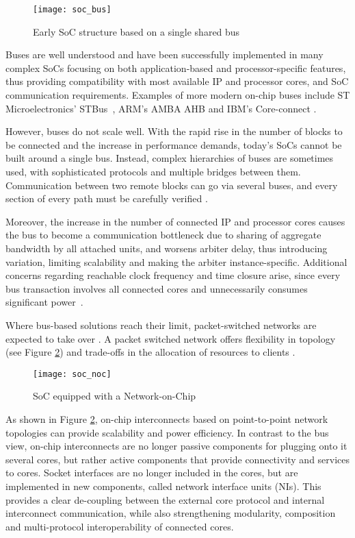 	\begin{figure}[ht]
	\centering
		\texttt{[image: soc\_bus]}
		\caption{Early SoC structure based on a single shared bus}
		\label{fig:soc_bus}
	\end{figure} 

Buses are well understood and have been successfully implemented in many complex SoCs focusing on both application-based and processor-specific features, thus providing compatibility with most available IP and processor cores, and SoC communication requirements. 
Examples of more modern on-chip buses include ST Microelectronics' STBus~\cite{scandurra2002stbus}, ARM's AMBA AHB and IBM's Core-connect \cite{ryu2001comparison}.

However, buses do not scale well. With the rapid rise in the number of blocks to be connected and the
increase in performance demands, today's SoCs cannot be built around a single bus. Instead, complex hierarchies of buses are sometimes used, with sophisticated protocols and multiple bridges between them.
Communication between two remote blocks can go via several buses, and every section of every path must be carefully verified \cite{furber2005future}. 

Moreover, the increase in the number of connected IP and processor cores causes the bus to become a communication bottleneck due to sharing of aggregate bandwidth by all attached units, and worsens arbiter delay, thus introducing variation, limiting scalability and making the arbiter instance-specific. 
Additional concerns regarding reachable clock frequency and time closure arise, since every bus transaction involves all connected cores and unnecessarily consumes significant power~\cite{coppola2008design}.

Where bus-based solutions reach their limit, packet-switched networks are expected to take over \cite{dally2001route}. 
A packet switched network offers flexibility in topology (see Figure \ref{fig:soc_noc}) and trade-offs in the allocation of resources to clients \cite{furber2005future}.

	\begin{figure}[ht]
	\centering
		\texttt{[image: soc\_noc]}
		\caption{SoC equipped with a Network-on-Chip}
		\label{fig:soc_noc}
	\end{figure} 

As shown in Figure \ref{fig:soc_noc}, on-chip interconnects based on point-to-point network topologies can provide scalability and power efficiency.
In contrast to the bus view, on-chip interconnects are no longer passive components for plugging onto it several cores, but rather active components that provide connectivity and services to cores.
Socket interfaces are no longer included in the cores, but are implemented in new components, called network interface units (NIs). 
This provides a clear de-coupling between the external core protocol and internal interconnect communication, while also strengthening modularity, composition and multi-protocol interoperability of connected cores.


